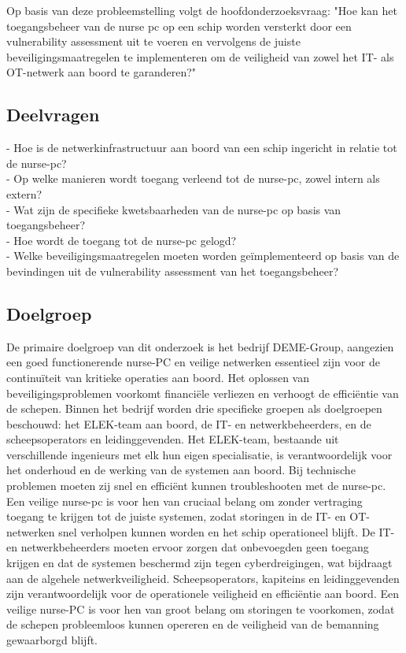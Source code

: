 Op basis van deze probleemstelling volgt de hoofdonderzoeksvraag:
"Hoe kan het toegangsbeheer van de nurse pc op een schip worden versterkt door een vulnerability assessment uit te voeren en vervolgens de juiste beveiligingsmaatregelen te implementeren om de veiligheid van zowel het IT- als OT-netwerk aan boord te garanderen?"

\subsection{Deelvragen}
- Hoe is de netwerkinfrastructuur aan boord van een schip ingericht in relatie tot de nurse-pc? \\     
- Op welke manieren wordt toegang verleend tot de nurse-pc, zowel intern als extern? \\     
- Wat zijn de specifieke kwetsbaarheden van de nurse-pc op basis van toegangsbeheer? \\      
- Hoe wordt de toegang tot de nurse-pc gelogd?  \\   
- Welke beveiligingsmaatregelen moeten worden geïmplementeerd op basis van de bevindingen uit de vulnerability assessment van het toegangsbeheer? \\


\subsection{Doelgroep}
De primaire doelgroep van dit onderzoek is het bedrijf DEME-Group, aangezien een goed functionerende nurse-PC en veilige netwerken essentieel zijn voor de continuïteit van kritieke operaties aan boord. Het oplossen van beveiligingsproblemen voorkomt financiële verliezen en verhoogt de efficiëntie van de schepen.
Binnen het bedrijf worden drie specifieke groepen als doelgroepen beschouwd: het ELEK-team aan boord, de IT- en netwerkbeheerders, en de scheepsoperators en leidinggevenden.
Het ELEK-team, bestaande uit verschillende ingenieurs met elk hun eigen specialisatie, is verantwoordelijk voor het onderhoud en de werking van de systemen aan boord. Bij technische problemen moeten zij snel en efficiënt kunnen troubleshooten met de nurse-pc. Een veilige nurse-pc is voor hen van cruciaal belang om zonder vertraging toegang te krijgen tot de juiste systemen, zodat storingen in de IT- en OT-netwerken snel verholpen kunnen worden en het schip operationeel blijft.
De IT- en netwerkbeheerders moeten ervoor zorgen dat onbevoegden geen toegang krijgen en dat de systemen beschermd zijn tegen cyberdreigingen, wat bijdraagt aan de algehele netwerkveiligheid.
Scheepsoperators, kapiteins en leidinggevenden zijn verantwoordelijk voor de operationele veiligheid en efficiëntie aan boord. Een veilige nurse-PC is voor hen van groot belang om storingen te voorkomen, zodat de schepen probleemloos kunnen opereren en de veiligheid van de bemanning gewaarborgd blijft.


